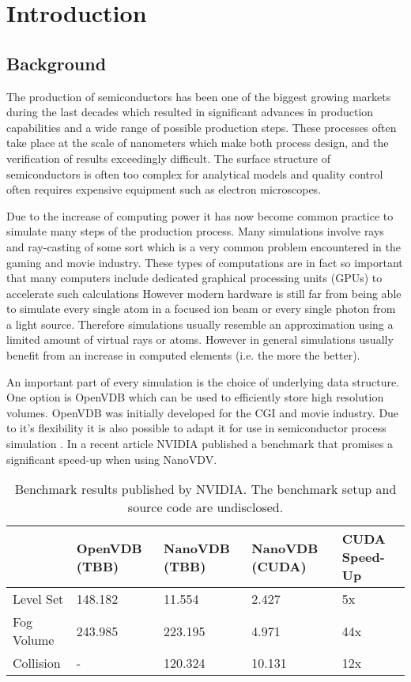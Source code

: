 \section{Introduction}
\subsection{Background}
The production of semiconductors has been one of the biggest growing markets during the last decades which resulted in significant advances in production capabilities and a wide range of possible production steps.
These processes often take place at the scale of nanometers which make both process design, and the verification of results exceedingly difficult.
The surface structure of semiconductors is often too complex for analytical models and quality control often requires expensive equipment such as electron microscopes.

Due to the increase of computing power it has now become common practice to simulate many steps of the production process.
Many simulations involve rays and ray-casting of some sort which is a very common problem encountered in the gaming and movie industry.
These types of computations are in fact so important that many computers include dedicated graphical processing units (GPUs) to accelerate such calculations
However modern hardware is still far from being able to simulate every single atom in a focused ion beam or every single photon from a light source.
Therefore simulations usually resemble an approximation using a limited amount of virtual rays or atoms.
However in general simulations usually benefit from an increase in computed elements (i.e. the more the better).

An important part of every simulation is the choice of underlying data structure.
One option is OpenVDB which can be used to efficiently store high resolution volumes. \cite{openvdb}
OpenVDB was initially developed for the CGI and movie industry. Due to it's flexibility it is also possible to adapt it for use in semiconductor process simulation \cite{manstetten2018efficient}.
In a recent article  NVIDIA published a benchmark that promises a significant speed-up when using NanoVDV.

\begin{table}[H]
    \caption{Benchmark results published by NVIDIA. The benchmark setup and source code are undisclosed. \cite{nanovdb_nvidia}}
    \centering
    \begin{tabular}{@{}lllll@{}}
        \toprule
                   & OpenVDB (TBB) & NanoVDB (TBB) & NanoVDB (CUDA) & CUDA Speed-Up \\	\hline
        Level Set  & 148.182       & 11.554        & 2.427          & 5x            \\
        Fog Volume & 243.985       & 223.195       & 4.971          & 44x           \\
        Collision  & -             & 120.324       & 10.131         & 12x           \\ \bottomrule
    \end{tabular}
    \label{tab:nvidia_benchmark}
\end{table}

